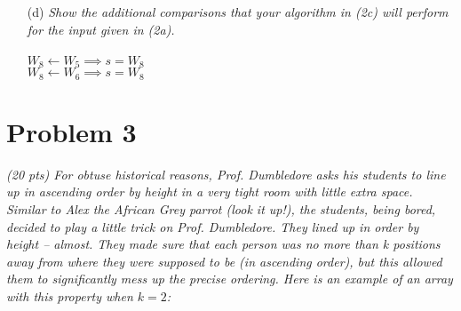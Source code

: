 \documentclass[11pt]{article} \setlength{\oddsidemargin}{0in}
\begin{document}
{\begin{enumerate}
    Since there are at most $log_2 n$ iterations, with one comparison to \textit{p} in each iteration - there are at most $log_2 n$ additional comparisons. In reality this is $log_2 n - 1$ as the last iteration gives us a starting value for \textit{s} with no comparison needed. 
    
  \item[(d)]{\textit{Show the additional comparisons that your algorithm
        in (2c) will perform for the input given in (2a).}}
    \\\\
    $W_8 \leftarrow W_5 \implies \textit{s} = W_8$ \\
    $W_8 \leftarrow W_6 \implies \textit{s} = W_8$ \\

  \end{enumerate}

  \newpage

  \section*{Problem 3}

  \textit{(20 pts) For obtuse historical reasons, Prof. Dumbledore asks
    his students to line up in ascending order by height in a very tight
    room with little extra space. Similar to Alex the African Grey
    parrot (look it up!), the students, being bored, decided to play a
    little trick on Prof. Dumbledore. They lined up in order by height --
    almost. They made sure that each person was no more than k positions
    away from where they were supposed to be (in ascending order), but
    this allowed them to significantly mess up the precise
    ordering. Here is an example of an array with this property when
    $k = 2$:}



  }
\end{document}
